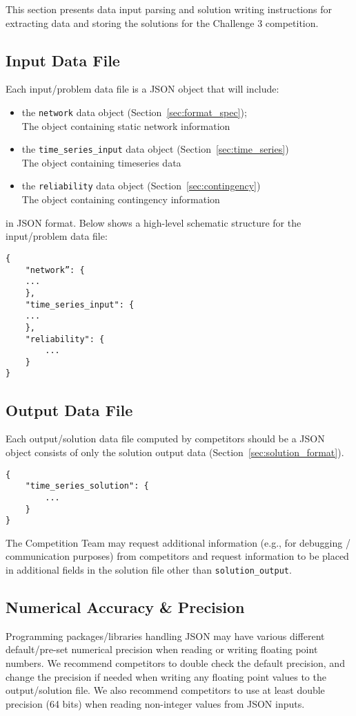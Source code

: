 This section presents data input parsing and solution writing instructions for
extracting data and storing the solutions 
for the Challenge 3 competition.

\subsection{Input Data File}
Each input/problem data file is a JSON object that will include:
\begin{itemize}
    \item the \texttt{network} data object (Section~\ref{sec:format_spec});\\
        The object containing static network information
    \item the \texttt{time\_series\_input} data object (Section~\ref{sec:time_series})\\
        The object containing timeseries data
    \item the \texttt{reliability} data object (Section~\ref{sec:contingency})\\
        The object containing contingency information
\end{itemize}
in JSON format. Below shows a high-level schematic structure for the input/problem data file:
\begin{verbatim}
{
    "network”: {
    ...
    },
    "time_series_input": {
    ...
    },
    "reliability": {
        ...
    }
}
\end{verbatim}

\subsection{Output Data File}
Each output/solution data file computed by competitors should be a JSON object consists of only 
the solution output data (Section~\ref{sec:solution_format}).
\begin{verbatim}
{
    "time_series_solution": {
        ...
    }    
}
\end{verbatim}
The Competition Team may request additional information (e.g., for debugging / communication purposes)
from competitors and request information to be placed in 
additional fields in the solution file other than \texttt{solution\_output}. 

\subsection{Numerical Accuracy \& Precision}
Programming packages/libraries handling JSON may have various different 
default/pre-set numerical precision when reading or writing floating point numbers.
We recommend competitors to 
double check the default precision,
and change the precision if needed
when writing any floating point values to the output/solution file.
We also recommend competitors to use at least double precision (64 bits) 
when reading non-integer values from JSON inputs. 

